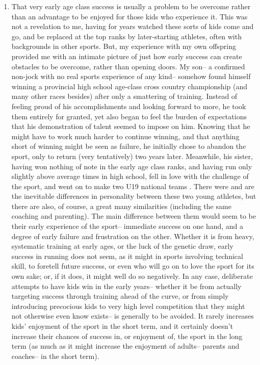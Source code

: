 \begin{enumerate}
    \item That very early age class success is usually a problem to be overcome rather than an advantage to be enjoyed for those kids who experience it. This was not a revelation to me, having for years watched these sorts of kids come and go, and be replaced at the top ranks by later-starting athletes, often with backgrounds in other sports. But, my experience with my own offspring provided me with an intimate picture of just how early success can create obstacles to be overcome, rather than opening doors. My son-- a confirmed non-jock with no real sports experience of any kind-- somehow found himself winning a provincial high school age-class cross country championship (and many other races besides) after only a smattering of training. Instead of feeling proud of his accomplishments and looking forward to more, he took them entirely for granted, yet also began to feel the burden of expectations that his demonstration of talent seemed to impose on him. Knowing that he might have to work much harder to continue winning, and that anything short of winning might be seen as failure, he initially chose to abandon the sport, only to return (very tentatively) two years later. Meanwhile, his sister, having won nothing of note in the early age class ranks, and having run only slightly above average times in high school, fell in love with the challenge of the sport, and went on to make two U19 national teams . There were and are the inevitable differences in personality between these two young athletes, but there are also, of course, a great many similarities (including the same coaching and parenting). The main difference between them would seem to be their early experience of the sport-- immediate success on one hand, and a degree of early failure and frustration on the other. Whether it is from heavy, systematic training at early ages, or the luck of the genetic draw, early success in running does not seem, as it might in sports involving technical skill, to foretell future success, or even who will go on to love the sport for its own sake; or, if it does, it might well do so negatively. In any case, deliberate attempts to have kids win in the early years-- whether it be from actually targeting success through training ahead of the curve, or from simply introducing precocious kids to very high level competition that they might not otherwise even know exists-- is generally to be avoided. It rarely increases kids' enjoyment of the sport in the short term, and it certainly doesn't increase their chances of success in, or enjoyment of, the sport in the long term (as much as it might increase the enjoyment of adults-- parents and coaches-- in the short term).


\end{enumerate}
